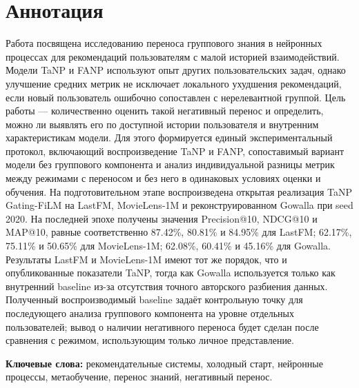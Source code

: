 \documentclass[12pt,a4paper]{article}
\begin{document}
\section*{Аннотация}
Работа посвящена исследованию переноса группового знания в нейронных процессах
для рекомендаций пользователям с малой историей взаимодействий. Модели TaNP и
FANP используют опыт других пользовательских задач, однако улучшение средних
метрик не исключает локального ухудшения рекомендаций, если новый пользователь
ошибочно сопоставлен с нерелевантной группой. Цель работы --- количественно
оценить такой негативный перенос и определить, можно ли выявлять его по
доступной истории пользователя и внутренним характеристикам модели. Для этого
формируется единый экспериментальный протокол, включающий воспроизведение TaNP
и FANP, сопоставимый вариант модели без группового компонента и анализ
индивидуальной разницы метрик между режимами с переносом и без него в
одинаковых условиях оценки и обучения. На
подготовительном этапе воспроизведена открытая реализация TaNP Gating-FiLM на
LastFM, MovieLens-1M и реконструированном Gowalla при seed 2020. На последней
эпохе получены значения Precision@10, NDCG@10 и MAP@10, равные соответственно
87.42\%, 80.81\% и 84.95\% для LastFM; 62.17\%, 75.11\% и 50.65\% для
MovieLens-1M; 62.08\%, 60.41\% и 45.16\% для Gowalla. Результаты LastFM и
MovieLens-1M имеют тот же порядок, что и опубликованные показатели TaNP, тогда
как Gowalla используется только как внутренний baseline из-за отсутствия
точного авторского разбиения данных. Полученный воспроизводимый baseline
задаёт контрольную точку для последующего анализа группового компонента на
уровне отдельных пользователей; вывод о наличии негативного переноса будет
сделан после сравнения с режимом, использующим только личное представление.

\vspace{0.5cm}
\noindent\textbf{Ключевые слова:}
рекомендательные системы, холодный старт, нейронные процессы, метаобучение,
перенос знаний, негативный перенос.
\end{document}
